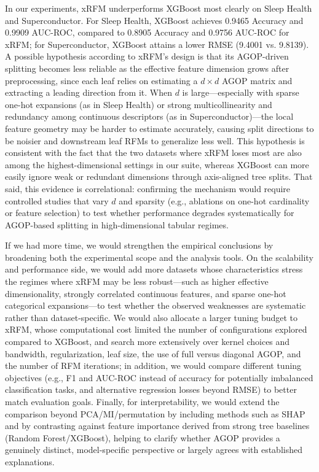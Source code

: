 In our experiments, xRFM underperforms XGBoost most clearly on Sleep Health and Superconductor. For Sleep Health, XGBoost achieves 0.9465 Accuracy and 0.9909 AUC-ROC, compared to 0.8905 Accuracy and 0.9756 AUC-ROC for xRFM; for Superconductor, XGBoost attains a lower RMSE (9.4001 vs. 9.8139). A possible hypothesis according to xRFM’s design is that its AGOP-driven splitting becomes less reliable as the effective feature dimension grows after preprocessing, since each leaf relies on estimating a $d\times d$ AGOP matrix and extracting a leading direction from it. When $d$ is large---especially with sparse one-hot expansions (as in Sleep Health) or strong multicollinearity and redundancy among continuous descriptors (as in Superconductor)---the local feature geometry may be harder to estimate accurately, causing split directions to be noisier and downstream leaf RFMs to generalize less well. This hypothesis is consistent with the fact that the two datasets where xRFM loses most are also among the highest-dimensional settings in our suite, whereas XGBoost can more easily ignore weak or redundant dimensions through axis-aligned tree splits. That said, this evidence is correlational: confirming the mechanism would require controlled studies that vary $d$ and sparsity (e.g., ablations on one-hot cardinality or feature selection) to test whether performance degrades systematically for AGOP-based splitting in high-dimensional tabular regimes.

If we had more time, we would strengthen the empirical conclusions by broadening both the experimental scope and the analysis tools. On the scalability and performance side, we would add more datasets whose characteristics stress the regimes where xRFM may be less robust---such as higher effective dimensionality, strongly correlated continuous features, and sparse one-hot categorical expansions---to test whether the observed weaknesses are systematic rather than dataset-specific. We would also allocate a larger tuning budget to xRFM, whose computational cost limited the number of configurations explored compared to XGBoost, and search more extensively over kernel choices and bandwidth, regularization, leaf size, the use of full versus diagonal AGOP, and the number of RFM iterations; in addition, we would compare different tuning objectives (e.g., F1 and AUC-ROC instead of accuracy for potentially imbalanced classification tasks, and alternative regression losses beyond RMSE) to better match evaluation goals. Finally, for interpretability, we would extend the comparison beyond PCA/MI/permutation by including methods such as SHAP and by contrasting against feature importance derived from strong tree baselines (Random Forest/XGBoost), helping to clarify whether AGOP provides a genuinely distinct, model-specific perspective or largely agrees with established explanations.
